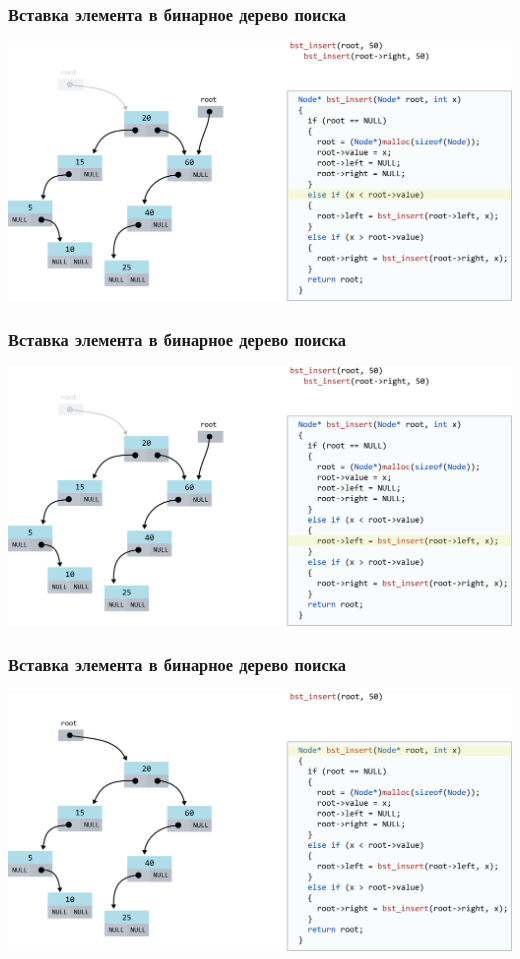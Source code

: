 \documentclass[10pt,pdf,hyperref={unicode}]{beamer}
\begin{document}
\begin{frame}[fragile]
\frametitle{Вставка элемента в бинарное дерево поиска}
\begin{center}
\includegraphics[scale=0.6]{images/tree/codetree/codetree5.png}
\end{center}
\end{frame}
\begin{frame}[fragile]
\frametitle{Вставка элемента в бинарное дерево поиска}
\begin{center}
\includegraphics[scale=0.6]{images/tree/codetree/codetree6.png}
\end{center}
\end{frame}
\begin{frame}[fragile]
\frametitle{Вставка элемента в бинарное дерево поиска}
\begin{center}
\includegraphics[scale=0.6]{images/tree/codetree/codetree1.png}
\end{center}
\end{frame}
\end{document}
